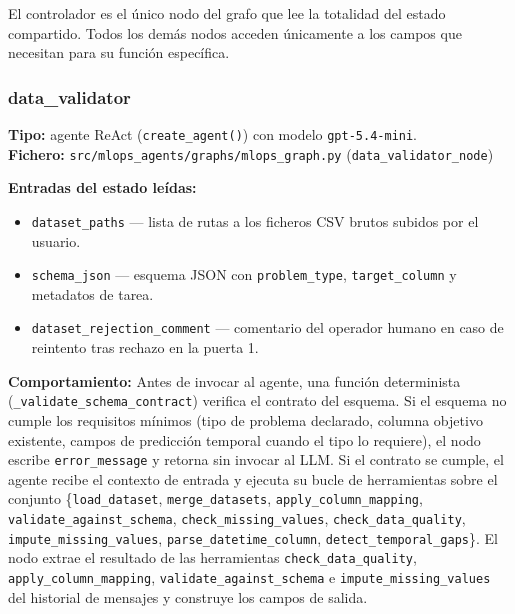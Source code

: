 El controlador es el único nodo del grafo que lee la totalidad del estado compartido.
Todos los demás nodos acceden únicamente a los campos que necesitan para su función específica.

\subsubsection*{data\_validator}
\label{sec:nodo-data-validator}

\textbf{Tipo:} agente ReAct (\texttt{create\_agent()}) con modelo \texttt{gpt-5.4-mini}.\\
\textbf{Fichero:} \texttt{src/mlops\_agents/graphs/mlops\_graph.py} (\texttt{data\_validator\_node})

\textbf{Entradas del estado leídas:}
\begin{itemize}
  \item \texttt{dataset\_paths} — lista de rutas a los ficheros CSV brutos subidos por el usuario.
  \item \texttt{schema\_json} — esquema JSON con \texttt{problem\_type}, \texttt{target\_column} y metadatos de tarea.
  \item \texttt{dataset\_rejection\_comment} — comentario del operador humano en caso de reintento tras rechazo en la puerta 1.
\end{itemize}

\textbf{Comportamiento:} Antes de invocar al agente, una función determinista (\texttt{\_validate\_schema\_contract}) verifica el contrato del esquema. Si el esquema no cumple los requisitos mínimos (tipo de problema declarado, columna objetivo existente, campos de predicción temporal cuando el tipo lo requiere), el nodo escribe \texttt{error\_message} y retorna sin invocar al LLM. Si el contrato se cumple, el agente recibe el contexto de entrada y ejecuta su bucle de herramientas sobre el conjunto \{\texttt{load\_dataset}, \texttt{merge\_datasets}, \texttt{apply\_column\_mapping}, \texttt{validate\_against\_schema}, \texttt{check\_missing\_values}, \texttt{check\_data\_quality}, \texttt{impute\_missing\_values}, \texttt{parse\_datetime\_column}, \texttt{detect\_temporal\_gaps}\}. El nodo extrae el resultado de las herramientas \texttt{check\_data\_quality}, \texttt{apply\_column\_mapping}, \texttt{validate\_against\_schema} e \texttt{impute\_missing\_values} del historial de mensajes y construye los campos de salida.

